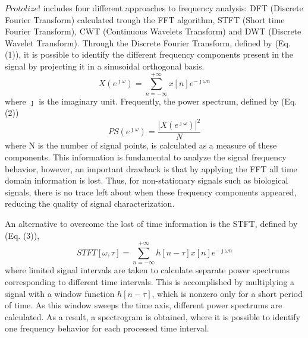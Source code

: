 \documentclass[12pt, a4paper]{article}
\begin{document}
$Protolize!$ includes four different approaches to frequency analysis: DFT (Discrete Fourier Transform) calculated trough the FFT algorithm, STFT (Short time Fourier Transform), CWT (Continuous Wavelets Transform) and DWT (Discrete Wavelet Transform). 
Through the Discrete Fourier Transform, defined by (Eq. (1)), it is possible to identify the different frequency components present in the signal by projecting it in a sinusoidal orthogonal basis.
\begin{equation}
X(e^{\jmath \omega}) = \sum\limits_{n = -\infty}^{+\infty} x[n] e^{- \jmath \omega n}
\end{equation}
where $\jmath$ is the imaginary unit. Frequently, the power spectrum, defined by (Eq. (2)) 
\begin{equation}
PS(e^{\jmath \omega}) = \frac{|X(e^{\jmath \omega})|^2}{N}
\end{equation}
where N is the number of signal points, is calculated as a measure of these components. This information is fundamental to analyze the signal frequency behavior, however, an important drawback is that by applying the FFT all time domain information is lost. Thus, for non-stationary signals such as biological signals, there is no trace left about when these frequency components appeared, reducing the quality of signal characterization.

An alternative to overcome the lost of time information is the STFT, defined by (Eq. (3)),
\begin{equation}
STFT[\omega, \tau] = \sum\limits_{n = -\infty}^{+\infty} h[n - \tau] x[n] e^{- \jmath \omega n}
\end{equation}
where limited signal intervals are taken to calculate separate power spectrums corresponding to different time intervals. This is accomplished by multiplying a signal with a window function $h[n-\tau]$, which is nonzero only for a short period of time. As this window sweeps the time axis, different power spectrums are calculated. As a result, a spectrogram is obtained, where it is possible to identify one frequency behavior for each processed time interval. 
\end{document}
